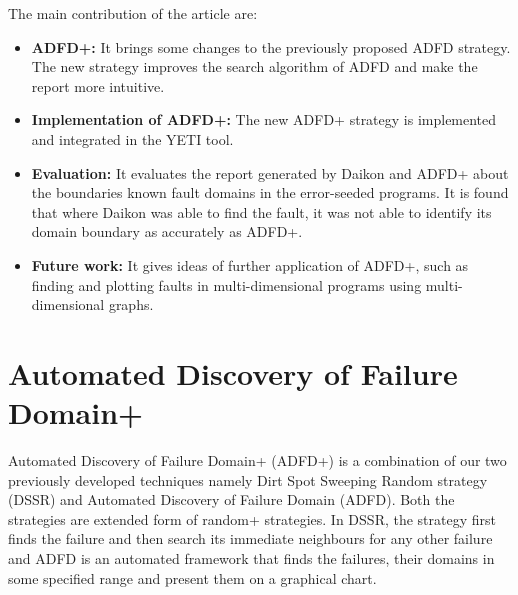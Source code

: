 \documentclass{acm_proc_article-sp}
\begin{document}
The main contribution of the article are:
\begin{itemize}
\item \textbf{ADFD+:} It brings some changes to the previously proposed ADFD strategy. The new strategy improves the search algorithm of ADFD and make the report more intuitive.
\item \textbf{Implementation of ADFD+:} The new ADFD+ strategy is implemented and integrated in the YETI tool.
\item \textbf{Evaluation:} It evaluates the report generated by Daikon and ADFD+ about the boundaries known fault domains in the error-seeded programs. It is found that where Daikon was able to find the fault, it was not able to identify its domain boundary as accurately as ADFD+.
\item \textbf{Future work:} It gives ideas of further application of ADFD+, such as finding and plotting faults in multi-dimensional programs using multi-dimensional graphs. 
\end{itemize}



\section{Automated Discovery of Failure Domain+}\label{sec:adfd}

Automated Discovery of Failure Domain+ (ADFD+) is a combination of our two previously developed techniques namely Dirt Spot Sweeping Random strategy (DSSR) and Automated Discovery of Failure Domain (ADFD). Both the strategies are extended form of random+ strategies. In DSSR, the strategy first finds the failure and then search its immediate neighbours for any other failure and ADFD is an automated framework that finds the failures, their domains in some specified range and present them on a graphical chart\cite{DSSR, ADFD}. 
\end{document}
